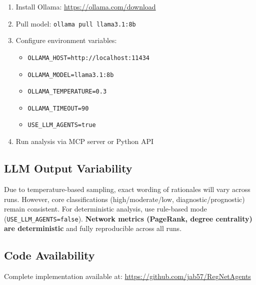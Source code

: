 \documentclass[11pt]{article}
\begin{document}
\begin{enumerate}
\item Install Ollama: \url{https://ollama.com/download}
\item Pull model: \texttt{ollama pull llama3.1:8b}
\item Configure environment variables:
\begin{itemize}
\item \texttt{OLLAMA\_HOST=http://localhost:11434}
\item \texttt{OLLAMA\_MODEL=llama3.1:8b}
\item \texttt{OLLAMA\_TEMPERATURE=0.3}
\item \texttt{OLLAMA\_TIMEOUT=90}
\item \texttt{USE\_LLM\_AGENTS=true}
\end{itemize}
\item Run analysis via MCP server or Python API
\end{enumerate}

\subsection{LLM Output Variability}

Due to temperature-based sampling, exact wording of rationales will vary across runs. However, core classifications (high/moderate/low, diagnostic/prognostic) remain consistent. For deterministic analysis, use rule-based mode (\texttt{USE\_LLM\_AGENTS=false}). \textbf{Network metrics (PageRank, degree centrality) are deterministic} and fully reproducible across all runs.

\subsection{Code Availability}

Complete implementation available at: \url{https://github.com/jab57/RegNetAgents}
\end{document}
